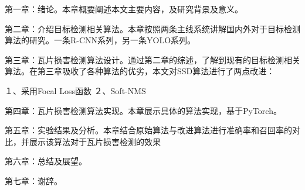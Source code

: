 第一章：绪论。本章概要阐述本文主要内容，及研究背景及意义。

第二章：介绍目标检测相关算法。本章按照两条主线系统讲解国内外对于目标检测算法的研究。一条R-CNN系列，另一条YOLO系列。

第三章：瓦片损害检测算法设计。通过第二章的综述，了解到现有的目标检测相关算法。在第三章吸收了各种算法的优劣，本文对SSD算法进行了两点改进：

１、采用Focal Loss函数
２、Soft-NMS

第四章：瓦片损害检测算法实现。本章展示具体的算法实现，基于PyTorch。

第五章：实验结果及分析。本章结合原始算法与改进算法进行准确率和召回率的对比，并展示该算法对于瓦片损害检测的效果　

第六章：总结及展望。

第七章：谢辞。